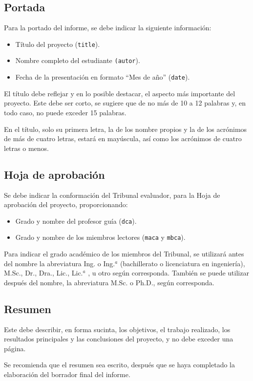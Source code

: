 \subsection{Portada}
Para la portado del informe, se debe indicar la siguiente información:
\begin{itemize}
	\item Título del proyecto (\texttt{title}).
	\item Nombre completo del estudiante \texttt{(autor}).
	\item Fecha de la presentación en formato ``Mes de año'' (\texttt{date}).
\end{itemize}

El título debe reflejar y en lo posible destacar, el aspecto más importante del proyecto.  Este debe ser corto, se sugiere que de no más de 10 a 12 palabras y, en todo caso, no puede exceder 15 palabras.

En el título, solo su primera letra, la de los nombre propios y la de los acrónimos de más de cuatro letras, estará en mayúscula, así como los acrónimos de cuatro letras o menos.

\subsection{Hoja de aprobación}
Se debe indicar la conformación del Tribunal evaluador, para la Hoja de aprobación del proyecto, proporcionando:
\begin{itemize}
	\item Grado y nombre del profesor guía (\texttt{dca}).
	\item Grado y nombre de los miembros lectores (\texttt{maca} y \texttt{mbca}).
\end{itemize}

Para indicar el grado académico de los miembros del Tribunal, se utilizará antes del nombre la abreviatura Ing. o Ing.$^a$ (bachillerato o licenciatura en ingeniería), M.Sc., Dr., Dra., Lic., Lic.$^a$ , u otro según corresponda.  También se puede utilizar después del nombre, la abreviatura M.Sc. o Ph.D., según corresponda.

\subsection{Resumen}
Este debe describir, en forma sucinta, los objetivos, el trabajo realizado, los resultados principales y las conclusiones del proyecto, y no debe exceder una página.

Se recomienda que el resumen sea escrito, después que se haya completado la elaboración del borrador final del informe.

